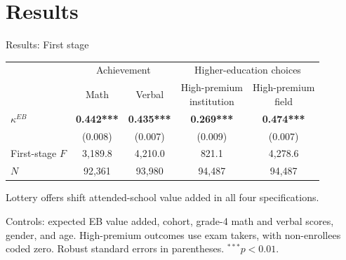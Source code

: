 \documentclass[11pt,aspectratio=169]{beamer}
\begin{document}
\section{Results}


\begin{frame}{Results: First stage}
\centering
\small
\setlength{\tabcolsep}{7pt}
\renewcommand{\arraystretch}{1.25}
\begin{tabular}{lcccc}
\toprule
& \multicolumn{2}{c}{Achievement} & \multicolumn{2}{c}{Higher-education choices} \\
\cmidrule(lr){2-3}\cmidrule(lr){4-5}
& Math & Verbal & \shortstack{High-premium\\institution} & \shortstack{High-premium\\field} \\
\midrule
$\kappa^{EB}$ & \textbf{0.442***} & \textbf{0.435***} & \textbf{0.269***} & \textbf{0.474***} \\
& (0.008) & (0.007) & (0.009) & (0.007) \\
First-stage $F$ & 3,189.8 & 4,210.0 & 821.1 & 4,278.6 \\
$N$ & 92,361 & 93,980 & 94,487 & 94,487 \\
\bottomrule
\end{tabular}

\vspace{0.8em}
\footnotesize
Lottery offers shift attended-school value added in all four specifications.

\vspace{0.6em}
\scriptsize
Controls: expected EB value added, cohort, grade-4 math and verbal scores, gender, and age.
High-premium outcomes use exam takers, with non-enrollees coded zero.
Robust standard errors in parentheses. $^{***}p<0.01$.
\end{frame}
\end{document}
